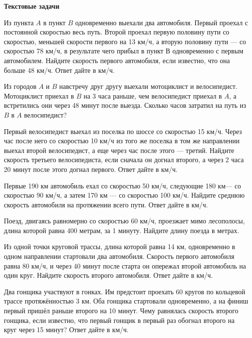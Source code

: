 \centerline{\bf \Huge Текстовые задачи}

 Из пункта $A$ в пункт $B$ одновременно выехали два автомобиля. Первый проехал с постоянной скоростью весь путь. Второй проехал первую половину пути со скоростью, меньшей скорости первого на 13 км/ч, а вторую половину пути — со скоростью 78 км/ч, в результате чего прибыл в пункт В одновременно с первым автомобилем. Найдите скорость первого автомобиля, если известно, что она больше 48 км/ч. Ответ дайте в км/ч.

 Из городов $A$ и $B$ навстречу друг другу выехали мотоциклист и велосипедист. Мотоциклист приехал в $B$ на 3 часа раньше, чем велосипедист приехал в $A$, а встретились они через 48 минут после выезда. Сколько часов затратил на путь из $B$ в $A$ велосипедист?

 Первый велосипедист выехал из поселка по шоссе со скоростью 15 км/ч. Через час после него со скоростью 10 км/ч из того же поселка в том же направлении выехал второй велосипедист, а еще через час после этого — третий. Найдите скорость третьего велосипедиста, если сначала он догнал второго, а через 2 часа 20 минут после этого догнал первого. Ответ дайте в км/ч.

 Первые 190 км автомобиль ехал со скоростью 50 км/ч, следующие 180 км— со скоростью 90 км/ч, а затем 170 км — со скоростью 100 км/ч. Найдите среднюю скорость автомобиля на протяжении всего пути. Ответ дайте в км/ч.

 Поезд, двигаясь равномерно со скоростью 60 км/ч, проезжает мимо лесополосы, длина которой равна 400 метрам, за 1 минуту. Найдите длину поезда в метрах.

 Из одной точки круговой трассы, длина которой равна 14 км, одновременно в одном направлении стартовали два автомобиля. Скорость первого автомобиля равна 80 км/ч, и через 40 минут после старта он опережал второй автомобиль на один круг. Найдите скорость второго автомобиля. Ответ дайте в км/ч.

 Два гонщика участвуют в гонках. Им предстоит проехать 60 кругов по кольцевой трассе протяжённостью 3 км. Оба гонщика стартовали одновременно, а на финиш первый пришёл раньше второго на 10 минут. Чему равнялась скорость второго гонщика, если известно, что первый гонщик в первый раз обогнал второго на круг через 15 минут? Ответ дайте в км/ч.

